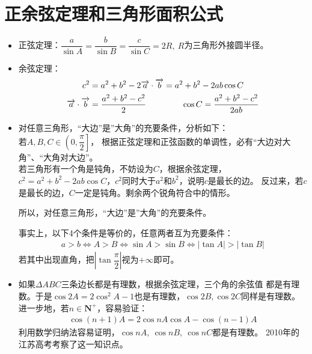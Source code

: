 \section{正余弦定理和三角形面积公式}
\begin{itemize}[leftmargin=\inteval{\myitemleftmargin}pt,itemsep=
   \inteval{\myitemitempsep}pt,topsep=\inteval{\myitemtopsep}pt]
\item 正弦定理：$ \dfrac{a}{\sin A}=\dfrac{b}{\sin B}=
\dfrac{c}{\sin C} =2R,\ R $为三角形外接圆半径。

\item 余弦定理：
\begin{gather*}
    c^2=a^2+b^2-2\vec{a}\cdot\vec{b}
    =a^2+b^2-2ab\cos C  \\
    \vec{a}\cdot\vec{b}=\dfrac{a^2+b^2-c^2}{2} 
    \hspace{1.5cm}     \cos C=\dfrac{a^2+b^2-c^2}{2ab}  
\end{gather*}

\item 对任意三角形，“大边”是”大角”的充要条件，分析如下：\\
若$ A,B,C\in\left(0,\dfrac{\pi}{2}\right] $，
根据正弦定理和正弦函数的单调性，必有“大边对大角”、“大角对大边”。\\
若三角形有一个角是钝角，不妨设为$ C $，根据余弦定理，
$ c^2=a^2+b^2-2ab\cos C $，$ c^2 $同时大于$ a^2 $和$ b^2 $，说明$ c $是最长的边。
反过来，若$ c $是最长的边，$ C $一定是钝角。剩余两个锐角符合中的情形。

所以，对任意三角形，“大边”是”大角”的充要条件。

事实上，以下4个条件是等价的，任意两者互为充要条件：
\begin{align*}
    a>b \Leftrightarrow A>B \Leftrightarrow \sin A>\sin B 
     \Leftrightarrow |\tan A|>|\tan B| 
\end{align*}
若其中出现直角，把$ \left|\tan \dfrac{\pi}{2}\right| $视为$ +\infty $即可。

\item 如果$ \Delta ABC $三条边长都是有理数，根据余弦定理，三个角的余弦值
都是有理数。于是$ \cos2A=2\cos^2A-1 $也是有理数，$ \cos2B,\cos2C $同样是有理数。
进一步地，若$ n\in \textbf{N}^+ $，容易验证：
\begin{align*}
    \cos(n+1)A =2\cos nA\cos A -\cos(n-1)A
\end{align*}
利用数学归纳法容易证明，$ \cos nA,\ \cos nB,\ \cos nC $都是有理数。
2010年的江苏高考考察了这一知识点。


\end{itemize}
